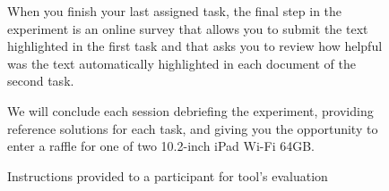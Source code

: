 \begin{figure}
\begin{mdframed}[backgroundcolor=gray!05]
\begin{footnotesize}
When you finish your last assigned task, the final step in the experiment is an online survey that allows you to submit the text highlighted in the first task and that asks you to review how helpful was the text automatically highlighted in each document of the second task. \medskip

We will conclude each session debriefing the experiment, providing reference solutions for each task, and giving you the opportunity to enter a raffle for one of two 10.2-inch iPad Wi-Fi 64GB.




\end{footnotesize}
\end{mdframed}
\caption{Instructions provided to a participant for \acs{tool}'s evaluation}
\end{figure}

\vfill
